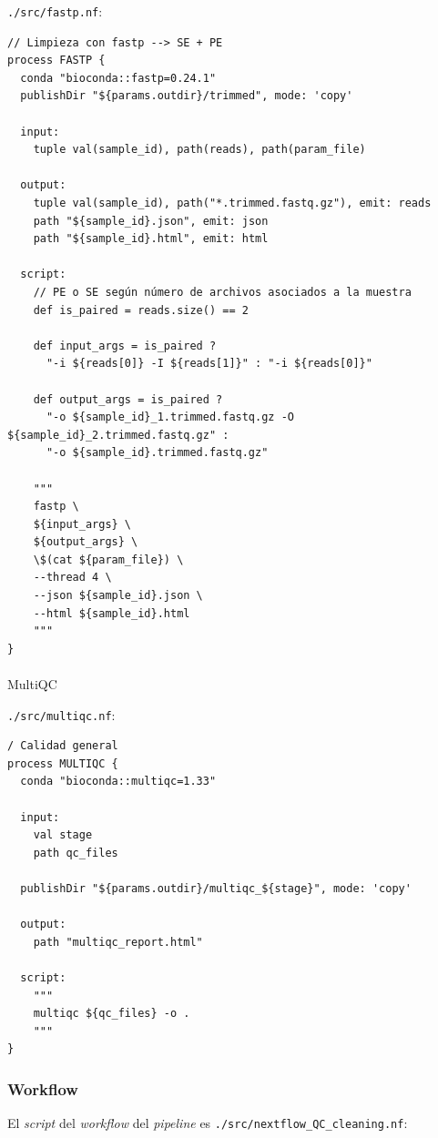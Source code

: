 \documentclass[
  letterpaper,
  DIV=11,
  numbers=noendperiod]{scrartcl}
\makeatletter
\let\oldparagraph\paragraph
\renewcommand{\paragraph}{
    \@ifstar
      \xxxParagraphStar
      \xxxParagraphNoStar
  }
\newcommand{\xxxParagraphStar}[1]{\oldparagraph*{#1}\mbox{}}
\newcommand{\xxxParagraphNoStar}[1]{\oldparagraph{#1}\mbox{}}
\makeatother
\begin{document}
\texttt{./src/fastp.nf}:

\begin{verbatim}
// Limpieza con fastp --> SE + PE
process FASTP {
  conda "bioconda::fastp=0.24.1"
  publishDir "${params.outdir}/trimmed", mode: 'copy'

  input:
    tuple val(sample_id), path(reads), path(param_file)

  output:
    tuple val(sample_id), path("*.trimmed.fastq.gz"), emit: reads
    path "${sample_id}.json", emit: json
    path "${sample_id}.html", emit: html

  script:
    // PE o SE según número de archivos asociados a la muestra
    def is_paired = reads.size() == 2

    def input_args = is_paired ?
      "-i ${reads[0]} -I ${reads[1]}" : "-i ${reads[0]}"

    def output_args = is_paired ?
      "-o ${sample_id}_1.trimmed.fastq.gz -O ${sample_id}_2.trimmed.fastq.gz" :
      "-o ${sample_id}.trimmed.fastq.gz"

    """
    fastp \
    ${input_args} \
    ${output_args} \
    \$(cat ${param_file}) \
    --thread 4 \
    --json ${sample_id}.json \
    --html ${sample_id}.html
    """
}
\end{verbatim}

\paragraph{MultiQC}\label{multiqc}

\texttt{./src/multiqc.nf}:

\begin{verbatim}
/ Calidad general
process MULTIQC {
  conda "bioconda::multiqc=1.33"

  input:
    val stage
    path qc_files

  publishDir "${params.outdir}/multiqc_${stage}", mode: 'copy'

  output:
    path "multiqc_report.html"

  script:
    """
    multiqc ${qc_files} -o .
    """
}
\end{verbatim}

\subsubsection{Workflow}\label{workflow}

El \emph{script} del \emph{workflow} del \emph{pipeline} es
\texttt{./src/nextflow\_QC\_cleaning.nf}:
\end{document}
